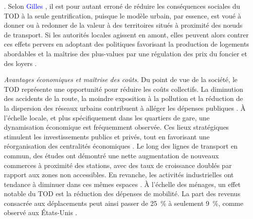 \begin{refsegment}
{}. Selon \textcolor{blue}{Gilles} \textcolor{blue}{\textcite[32]{bentayou_transit-oriented_2015}}, il est pour autant erroné de réduire les conséquences sociales du \acrshort{TOD} à la seule gentrification, puisque le modèle urbain, par essence, est voué à donner ou à redonner de la valeur à des territoires situés à proximité des nœuds de transport. Si les autorités locales agissent en amont, elles peuvent alors contrer ces effets pervers en adoptant des politiques favorisant la production de logements abordables et la maîtrise des plus-values par une régulation des prix du foncier et des loyers \textcolor{blue}{\autocites[17]{litman_evaluating_2011}[32]{bentayou_transit-oriented_2015}{yu_valueadded_2018}[463]{harrison_corridors_2019}{ewing_is_2022}}.%

\textsl{Avantages économiques et maîtrise des coûts}. Du point de vue de la société, le \acrshort{TOD} représente une opportunité pour réduire les coûts collectifs. La diminution des accidents de la route, la moindre exposition à la pollution et la réduction de la dispersion des réseaux urbains contribuent à alléger les dépenses publiques \textcolor{blue}{\autocite[17]{litman_evaluating_2011}}. À l’échelle locale, et plus spécifiquement dans les quartiers de gare, une dynamisation économique est fréquemment observée. Ces lieux stratégiques stimulent les investissements publics et privés, tout en favorisant une réorganisation des centralités économiques \textcolor{blue}{\autocites[89]{knowles_investigation_2014}[6]{knowles_evaluation_2016}}. Le long des lignes de transport en commun, des études ont démontré une nette augmentation de nouveaux commerces à proximité des stations, avec des taux de croissance doublés par rapport aux zones non accessibles. En revanche, les activités industrielles ont tendance à diminuer dans ces mêmes espaces \textcolor{blue}{\autocites{duncan_impact_2011}{credit_transit-oriented_2018}}. À l’échelle des ménages, un effet notable du \acrshort{TOD} est la réduction des dépenses de mobilité. La part des revenus consacrée aux déplacements peut ainsi passer de 25~\% à seulement 9~\%, comme observé aux États-Unis \textcolor{blue}{\autocites[25]{beauvais_amenagements_2017}[25]{nahlik_transit-oriented_2014}[38]{ohland_communicating_2006}}.%


\end{refsegment}

